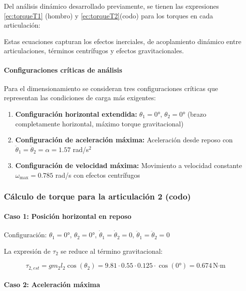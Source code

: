 Del análisis dinámico desarrollado previamente, se tienen las expresiones \ref{ec:torqueT1} (hombro) y \ref{ec:torqueT2}(codo) para los torques en cada articulación:

Estas ecuaciones capturan los efectos inerciales, de acoplamiento dinámico entre articulaciones, términos centrífugos y efectos gravitacionales.

\paragraph{Configuraciones críticas de análisis}

Para el dimensionamiento se consideran tres configuraciones críticas que representan las condiciones de carga más exigentes:

\begin{enumerate}
    \item \textbf{Configuración horizontal extendida:} $\theta_1 = 0°$, $\theta_2 = 0°$ (brazo completamente horizontal, máximo torque gravitacional)
    \item \textbf{Configuración de aceleración máxima:} Aceleración desde reposo con $\ddot{\theta}_1 = \ddot{\theta}_2 = \alpha = 1.57$ rad/s$^2$
    \item \textbf{Configuración de velocidad máxima:} Movimiento a velocidad constante $\omega_{\max} = 0.785$ rad/s con efectos centrífugos
\end{enumerate}

\subsubsection{Cálculo de torque para la articulación 2 (codo)}

\paragraph{Caso 1: Posición horizontal en reposo}

Configuración: $\theta_1 = 0°$, $\theta_2 = 0°$, $\dot{\theta}_1 = \dot{\theta}_2 = 0$, $\ddot{\theta}_1 = \ddot{\theta}_2 = 0$

La expresión de $\tau_2$ se reduce al término gravitacional:

\begin{equation}
\tau_{2,est} = gm_2l_2\cos(\theta_2) = 9.81 \cdot 0.55 \cdot 0.125 \cdot \cos(0°) = 0.674 \, \text{N·m}
\end{equation}

\paragraph{Caso 2: Aceleración máxima}

